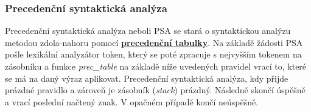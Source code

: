 \documentclass[a4paper, 12pt]{article} %
\begin{document}
            \subsubsection{Precedenční syntaktická analýza}
                Precedenční syntaktická analýza neboli PSA se stará o syntaktickou analýzu metodou
                zdola-nahoru pomocí \hyperref[prectabulka]{\textbf{precedenční tabulky}}. Na základě
                žádosti PSA pošle lexikální analyzátor token, který se poté zpracuje s nejvyšším tokenem
                na zásobníku a funkce \textit{prec\_table} na základě níže uvedených pravidel vrací to,
                které se má na daný výraz aplikovat. Precedenční syntaktická analýza, kdy přijde prázdné
                pravidlo a zároveň je zásobník (\textit{stack}) prázdný. Následně skončí úspěšně a vrací
                poslední načtený znak. V opačném případě končí neúspěšně.
\end{document}
